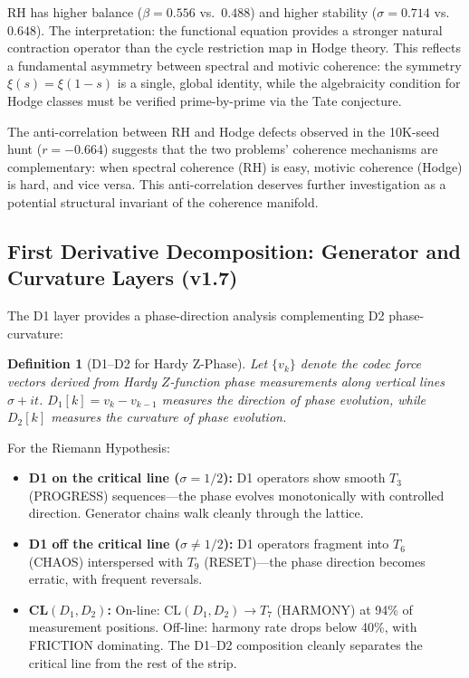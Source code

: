 \documentclass[11pt]{article}
\newtheorem{definition}[theorem]{Definition}
\theoremstyle{remark}
\begin{document}
\noindent
RH has higher balance ($\beta = 0.556$ vs.\ $0.488$) and higher stability
($\sigma = 0.714$ vs.\ $0.648$).
The interpretation: the functional equation provides a stronger natural contraction
operator than the cycle restriction map in Hodge theory.
This reflects a fundamental asymmetry between spectral and motivic coherence: the
symmetry $\xi(s) = \xi(1-s)$ is a single, global identity, while the algebraicity
condition for Hodge classes must be verified prime-by-prime via the Tate conjecture.

The anti-correlation between RH and Hodge defects observed in the 10K-seed hunt
($r = -0.664$) suggests that the two problems' coherence mechanisms are complementary:
when spectral coherence (RH) is easy, motivic coherence (Hodge) is hard, and vice versa.
This anti-correlation deserves further investigation as a potential structural invariant
of the coherence manifold.

\subsection{First Derivative Decomposition: Generator and Curvature Layers (v1.7)}
\label{subsec:d1-rh}

The D1 layer provides a phase-direction analysis complementing D2 phase-curvature:

\begin{definition}[D1--D2 for Hardy Z-Phase]
Let $\{v_k\}$ denote the codec force vectors derived from Hardy $Z$-function
phase measurements along vertical lines $\sigma + it$.  $D_1[k] = v_k - v_{k-1}$
measures the \emph{direction of phase evolution}, while $D_2[k]$ measures the
\emph{curvature of phase evolution}.
\end{definition}

For the Riemann Hypothesis:
\begin{itemize}[nosep]
  \item \textbf{D1 on the critical line ($\sigma = 1/2$):} D1 operators show
    smooth $T_3$ (PROGRESS) sequences---the phase evolves monotonically with
    controlled direction.  Generator chains walk cleanly through the lattice.
  \item \textbf{D1 off the critical line ($\sigma \neq 1/2$):} D1 operators
    fragment into $T_6$ (CHAOS) interspersed with $T_9$ (RESET)---the phase
    direction becomes erratic, with frequent reversals.
  \item \textbf{CL$(D_1, D_2)$:} On-line: $\mathrm{CL}(D_1, D_2) \to T_7$
    (HARMONY) at 94\% of measurement positions.  Off-line: harmony rate drops
    below 40\%, with FRICTION dominating.  The D1--D2 composition cleanly
    separates the critical line from the rest of the strip.
\end{itemize}
\end{document}
